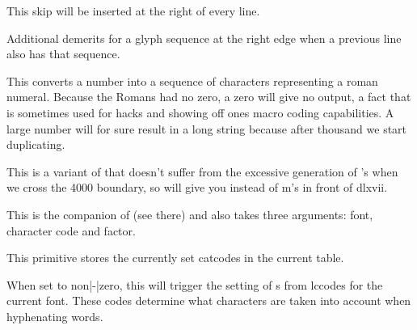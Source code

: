\stopnewprimitive

\startoldprimitive[title={\prm {rightskip}}]

This skip will be inserted at the right of every line.

\stopoldprimitive

\startnewprimitive[title={\prm {righttwindemerits}}]

Additional demerits for a glyph sequence at the right edge when a previous line
also has that sequence.

\stopnewprimitive

\startoldprimitive[title={\prm {romannumeral}}]

This converts a number into a sequence of characters representing a roman
numeral. Because the Romans had no zero, a zero will give no output, a fact that
is sometimes used for hacks and showing off ones macro coding capabilities. A
large number will for sure result in a long string because after thousand we
start duplicating.

\stopoldprimitive

\startnewprimitive[title={\prm {romannumerical}}]

This is a variant of  that doesn't suffer from the excessive
generation of 's when we cross the 4000 boundary, so  will
give you {\tttf {}} instead of  {\tttf m}'s in front
of {\tttf dlxvii}.

\stopnewprimitive

\startnewprimitive[title={\prm {rpcode}}]

This is the companion of  (see there) and also takes three
arguments: font, character code and factor.

\stopnewprimitive

\startnewprimitive[title={\prm {savecatcodetable}}]

This primitive stores the currently set catcodes in the current table.

\stopnewprimitive

\startoldprimitive[title={\prm {savinghyphcodes}}]

When set to non|-|zero, this will trigger the setting of s from \prm
{lccode}s for the current font. These codes determine what characters are taken
into account when hyphenating words.

\stopoldprimitive

\startoldprimitive[title={\prm {savingvdiscards}}]

